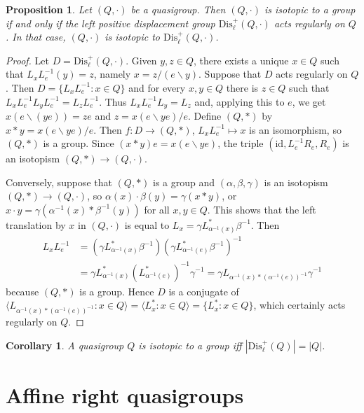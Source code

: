 \documentclass{amsart}
\def\rdiv{/}
\def\ldiv{\backslash}
\theoremstyle{plain}
\newtheorem{corollary}[theorem]{Corollary}
\newtheorem{proposition}[theorem]{Proposition}
\theoremstyle{definition}
\begin{document}
\begin{proposition}
Let $(Q,\cdot)$ be a quasigroup. Then $(Q,\cdot)$ is isotopic to a group if and only if the left positive displacement group $\mathrm{Dis}_\ell^+(Q,\cdot)$ acts regularly on $Q$. In that case, $(Q,\cdot)$ is isotopic to
$\mathrm{Dis}_\ell^+(Q,\cdot)$.
\end{proposition}
\begin{proof}
Let $D=\mathrm{Dis}_\ell^+(Q,\cdot)$. Given $y,z\in Q$, there exists a unique $x\in Q$ such that $L_xL_e^{-1}(y)=z$, namely $x = z\rdiv (e\ldiv y)$. Suppose that $D$ acts regularly on $Q$. Then $D=\{L_xL_e^{-1}:x\in Q\}$ and for every $x,y\in Q$ there is $z\in Q$ such that $L_xL_e^{-1}L_yL_e^{-1} = L_zL_e^{-1}$. Thus $L_xL_e^{-1}L_y = L_z$ and, applying this to $e$, we get $x(e\ldiv (ye)) = ze$ and $z=x(e\ldiv ye)\rdiv e$. Define $(Q,*)$ by $x*y = x(e\ldiv ye)\rdiv e$. Then $f:D\to (Q,*)$, $L_xL_e^{-1}\mapsto x$ is an isomorphism, so $(Q,*)$ is a group. Since $(x*y)e = x(e\ldiv ye)$, the triple $(\mathrm{id},L_e^{-1}R_e,R_e)$ is an isotopism $(Q,*)\to (Q,\cdot)$.

Conversely, suppose that $(Q,*)$ is a group and $(\alpha,\beta,\gamma)$ is an isotopism $(Q,*)\to (Q,\cdot)$, so $\alpha(x)\cdot\beta(y) = \gamma(x*y)$, or $x\cdot y = \gamma(\alpha^{-1}(x)*\beta^{-1}(y))$ for all $x,y\in Q$. This shows that the left translation by $x$ in $(Q,\cdot)$ is equal to $L_x = \gamma L_{\alpha^{-1}(x)}^*\beta^{-1}$. Then
\begin{align*}
    L_xL_e^{-1} &= (\gamma L_{\alpha^{-1}(x)}^*\beta^{-1})(\gamma L_{\alpha^{-1}(e)}^*\beta^{-1})^{-1}\\
     &= \gamma L_{\alpha^{-1}(x)}^*(L_{\alpha^{-1}(e)}^*)^{-1}\gamma^{-1} = \gamma L_{\alpha^{-1}(x)*(\alpha^{-1}(e))^{-1}}\gamma^{-1}
\end{align*}
because $(Q,*)$ is a group. Hence $D$ is a conjugate of $\langle L_{\alpha^{-1}(x)*(\alpha^{-1}(e))^{-1}}:x\in Q\rangle = \langle L_x^*:x\in Q\rangle = \{L_x^*:x\in Q\}$, which certainly acts regularly on $Q$.
\end{proof}

\begin{corollary}
A quasigroup $Q$ is isotopic to a group iff $|\mathrm{Dis}_\ell^+(Q)|=|Q|$.
\end{corollary}

\section{Affine right quasigroups}
\end{document}
